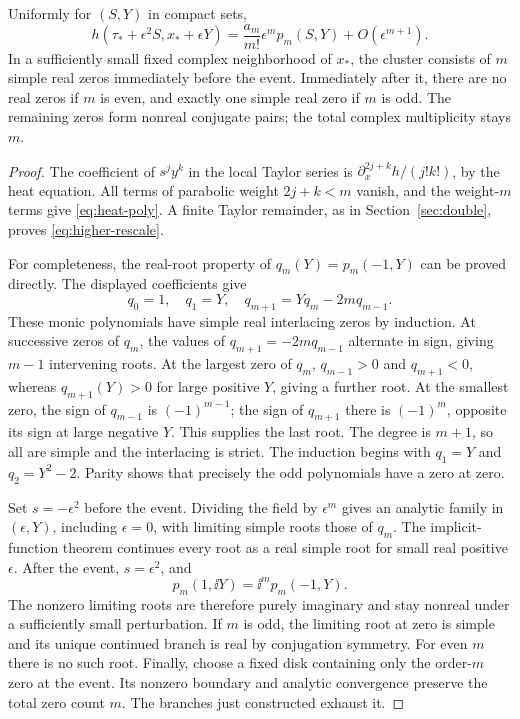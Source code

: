 \begin{theorem}\label{thm:higher}
Uniformly for \((S,Y)\) in compact sets,
\begin{equation}\label{eq:higher-rescale}
 h(\tau_*+\epsilon^2S,x_*+\epsilon Y)
 =\frac{a_m}{m!}\epsilon^m p_m(S,Y)+O(\epsilon^{m+1}).
\end{equation}
In a sufficiently small fixed complex neighborhood of \(x_*\), the
cluster consists of \(m\) simple real zeros immediately before the event.
Immediately after it, there are no real zeros if \(m\) is even, and
exactly one simple real zero if \(m\) is odd. The remaining zeros form
nonreal conjugate pairs; the total complex multiplicity stays \(m\).
\end{theorem}
\begin{proof}
The coefficient of \(s^jy^k\) in the local Taylor series is
\(\partial_x^{2j+k}h/(j!k!)\), by the heat equation. All terms of
parabolic weight \(2j+k<m\) vanish, and the weight-\(m\) terms give
\eqref{eq:heat-poly}. A finite Taylor remainder, as in
Section~\ref{sec:double}, proves \eqref{eq:higher-rescale}.

For completeness, the real-root property of \(q_m(Y)=p_m(-1,Y)\)
can be proved directly. The displayed coefficients give
\[
 q_0=1,\quad q_1=Y,\quad
 q_{m+1}=Yq_m-2m q_{m-1}.
\]
These monic polynomials have simple real interlacing zeros by induction.
At successive zeros of \(q_m\), the values of \(q_{m+1}=-2m q_{m-1}\)
alternate in sign, giving \(m-1\) intervening roots. At the largest
zero of \(q_m\), \(q_{m-1}>0\) and \(q_{m+1}<0\), whereas
\(q_{m+1}(Y)>0\) for large positive \(Y\), giving a further root.
At the smallest zero, the sign of \(q_{m-1}\) is \((-1)^{m-1}\);
the sign of \(q_{m+1}\) there is \((-1)^m\), opposite its sign at
large negative \(Y\). This supplies the last root. The degree is
\(m+1\), so all are simple and the interlacing is strict.
The induction begins with \(q_1=Y\) and \(q_2=Y^2-2\).
Parity shows that precisely the odd polynomials have a zero at zero.

Set \(s=-\epsilon^2\) before the event. Dividing the field by
\(\epsilon^m\) gives an analytic family in \((\epsilon,Y)\), including
\(\epsilon=0\), with limiting simple roots those of \(q_m\).
The implicit-function theorem continues every root as a real simple
root for small real positive \(\epsilon\).
After the event, \(s=\epsilon^2\), and
\[
 p_m(1,\ii Y)=\ii^m p_m(-1,Y).
\]
The nonzero limiting roots are therefore purely imaginary and stay
nonreal under a sufficiently small perturbation. If \(m\) is odd,
the limiting root at zero is simple and its unique continued branch
is real by conjugation symmetry. For even \(m\) there is no such root.
Finally, choose a fixed disk containing only the order-\(m\) zero at
the event. Its nonzero boundary and analytic convergence preserve the
total zero count \(m\). The branches just constructed exhaust it.
\end{proof}

